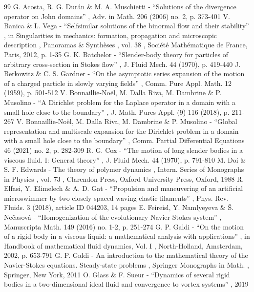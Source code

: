 \begin{thebibliography}{99}
 G. Acosta, R. G. Durán \& M. A. Muschietti - “Solutions of the divergence operator on John domains” , Adv. in Math. 206 (2006) no. 2, p. 373-401
 V. Banica \& L. Vega - “Selfsimilar solutions of the binormal flow and their stability” , in Singularities in mechanics: formation, propagation and microscopic description , Panoramas \& Synthèses , vol. 38 , Société Mathématique de France, Paris, 2012, p. 1-35
 G. K. Batchelor - “Slender-body theory for particles of arbitrary cross-section in Stokes flow” , J. Fluid Mech. 44 (1970), p. 419-440
 J. Berkowitz \& C. S. Gardner - “On the asymptotic series expansion of the motion of a charged particle in slowly varying fields” , Comm. Pure Appl. Math. 12 (1959), p. 501-512
 V. Bonnaillie-Noël, M. Dalla Riva, M. Dambrine \& P. Musolino - “A Dirichlet problem for the Laplace operator in a domain with a small hole close to the boundary” , J. Math. Pures Appl. (9) 116 (2018), p. 211-267
 V. Bonnaillie-Noël, M. Dalla Riva, M. Dambrine \& P. Musolino - “Global representation and multiscale expansion for the Dirichlet problem in a domain with a small hole close to the boundary” , Comm. Partial Differential Equations 46 (2021) no. 2, p. 282-309
 R. G. Cox - “The motion of long slender bodies in a viscous fluid. I: General theory” , J. Fluid Mech. 44 (1970), p. 791-810
 M. Doi \& S. F. Edwards - The theory of polymer dynamics , Intern. Series of Monographs in Physics , vol. 73 , Clarendon Press, Oxford University Press, Oxford, 1988
 R. Elfasi, Y. Elimelech \& A. D. Gat - “Propulsion and maneuvering of an artificial microswimmer by two closely spaced waving elastic filaments” , Phys. Rev. Fluids. 3 (2018), article ID 044203, 14 pages
 E. Feireisl, Y. Namlyeyeva \& Š. Nečasová - “Homogenization of the evolutionary Navier-Stokes system” , Manuscripta Math. 149 (2016) no. 1-2, p. 251-274
 G. P. Galdi - “On the motion of a rigid body in a viscous liquid: a mathematical analysis with applications” , in Handbook of mathematical fluid dynamics, Vol. I , North-Holland, Amsterdam, 2002, p. 653-791
 G. P. Galdi - An introduction to the mathematical theory of the Navier-Stokes equations. Steady-state problems , Springer Monographs in Math. , Springer, New York, 2011
 O. Glass \& F. Sueur - “Dynamics of several rigid bodies in a two-dimensional ideal fluid and convergence to vortex systems” , 2019

\end{thebibliography}
